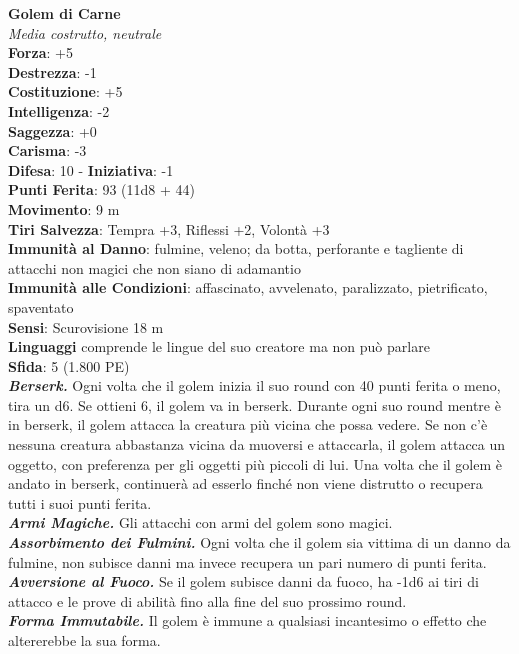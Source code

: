 \begin{multicols}{2}
\medskip\textbf{Golem di Carne}\\
\emph{Media costrutto, neutrale}\\
\textbf{Forza}: +5\\
\textbf{Destrezza}: -1\\
\textbf{Costituzione}: +5\\
\textbf{Intelligenza}: -2\\
\textbf{Saggezza}: +0\\
\textbf{Carisma}: -3\\
\textbf{Difesa}: 10 - \textbf{Iniziativa}: -1\\
\textbf{Punti Ferita}: 93 (11d8 + 44)\\
\textbf{Movimento}: 9 m\\
\textbf{Tiri Salvezza}: Tempra +3, Riflessi +2, Volontà +3\\
\textbf{Immunità al Danno}: fulmine, veleno; da botta, perforante e tagliente di attacchi non magici che non siano di adamantio\\
\textbf{Immunità alle Condizioni}: affascinato, avvelenato, paralizzato, pietrificato, spaventato\\
\textbf{Sensi}: Scurovisione 18 m\\
\textbf{Linguaggi} comprende le lingue del suo creatore ma non può parlare\\
\textbf{Sfida}: 5 (1.800 PE)\smallskip\\
\emph{\textbf{Berserk.}} Ogni volta che il golem inizia il suo round con 40 punti ferita o meno, tira un d6. Se ottieni 6, il golem va in berserk. Durante ogni suo round mentre è in berserk, il golem attacca la creatura più vicina che possa vedere. Se non c'è nessuna creatura abbastanza vicina da muoversi e attaccarla, il golem attacca un oggetto, con preferenza per gli oggetti più piccoli di lui. Una volta che il golem è andato in berserk, continuerà ad esserlo finché non viene distrutto o recupera tutti i suoi punti ferita.\\
\emph{\textbf{Armi Magiche.}} Gli attacchi con armi del golem sono magici.\\
\emph{\textbf{Assorbimento dei Fulmini.}} Ogni volta che il golem sia vittima di un danno da fulmine, non subisce danni ma invece recupera un pari numero di punti ferita.\\
\emph{\textbf{Avversione al Fuoco.}} Se il golem subisce danni da fuoco, ha -1d6 ai tiri di attacco e le prove di abilità fino alla fine del suo prossimo round.\\
\emph{\textbf{Forma Immutabile.}} Il golem è immune a qualsiasi incantesimo o effetto che altererebbe la sua forma.\\

\end{multicols}
